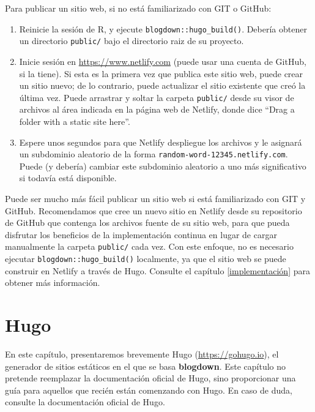 \documentclass[12pt,]{krantz}
\theoremstyle{definition}
\theoremstyle{definition}
\theoremstyle{definition}
\theoremstyle{remark}
\begin{document}
Para publicar un sitio web, si no está familiarizado con GIT o GitHub:

\begin{enumerate}
\def\labelenumi{\arabic{enumi}.}
\item
  Reinicie la sesión de R, y ejecute \texttt{blogdown::hugo\_build()}.
  Debería obtener un directorio \texttt{public/} bajo el directorio raiz
  de su proyecto.
\item
  Inicie sesión en \url{https://www.netlify.com} (puede
  usar una cuenta de GitHub, si la tiene). Si esta es la primera vez que
  publica este sitio web, puede crear un sitio nuevo; de lo contrario,
  puede actualizar el sitio existente que creó la última vez. Puede
  arrastrar y soltar la carpeta \texttt{public/} desde su visor de
  archivos al área indicada en la página web de Netlify, donde dice
  ``Drag a folder with a static site here''.
\item
  Espere unos segundos para que Netlify despliegue los archivos y le
  asignará un subdominio aleatorio de la forma
  \texttt{random-word-12345.netlify.com}. Puede (y debería) cambiar este
  subdominio aleatorio a uno más significativo si todavía está
  disponible.
\end{enumerate}

Puede ser mucho más fácil publicar un sitio web si está familiarizado
con GIT y GitHub. Recomendamos que cree un nuevo sitio en Netlify desde
su repositorio de GitHub que contenga los archivos fuente de su sitio
web, para que pueda disfrutar los beneficios de la implementación
continua en lugar de cargar manualmente la carpeta \texttt{public/} cada
vez. Con este enfoque, no es necesario ejecutar
\texttt{blogdown::hugo\_build()} localmente, ya que el sitio web se
puede construir en Netlify a través de Hugo. Consulte el capítulo
\ref{implementación} para obtener más información.

\hypertarget{hugo}{%
\chapter{Hugo}\label{hugo}}

En este capítulo, presentaremos brevemente Hugo
(\url{https://gohugo.io}), el generador de sitios estáticos en el que se
basa \textbf{blogdown}. Este capítulo no pretende reemplazar la
documentación oficial de Hugo, sino proporcionar una guía para aquellos
que recién están comenzando con Hugo. En caso de duda, consulte la
documentación oficial de Hugo.
\end{document}
